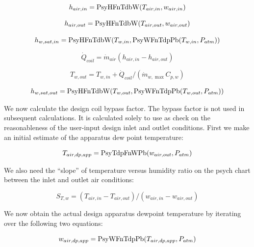 \begin{equation}
{h_{air,in}} = {\mathop{\rm PsyHFnTdbW}\nolimits} ({T_{air,in}},{w_{air,in}})
\end{equation}

\begin{equation}
{h_{air,out}} = {\mathop{\rm PsyHFnTdbW}\nolimits} ({T_{air,out}},{w_{air,out}})
\end{equation}

\begin{equation}
{h_{w,sat,in}} = {\rm{PsyHFnTdbW}}({T_{w,in}},{\rm{PsyWFnTdpPb}}({T_{w,in}},{P_{atm}}))
\end{equation}

\begin{equation}
{\dot Q_{coil}} = {\dot m_{air}}({h_{air,in}} - {h_{air,out}})
\end{equation}

\begin{equation}
{T_{w,out}} = {T_{w,in}} + {\dot Q_{coil}}/({\dot m_{w,\max }}{C_{p,w}})
\end{equation}

\begin{equation}
{h_{w,sat,out}} = {\rm{PsyHFnTdbW}}({T_{w,out}},{\rm{PsyWFnTdpPb}}({T_{w,out}},{P_{atm}}))
\end{equation}

We now calculate the design coil bypass factor. The bypass factor is not used in subsequent calculations. It is calculated solely to use as check on the reasonableness of the user-input design inlet and outlet conditions. First we make an initial estimate of the apparatus dew point temperature:

\begin{equation}
{T_{air,dp,app}} = {\rm{PsyTdpFnWPb}}({w_{air,out}},{P_{atm}})
\end{equation}

We also need the ``slope'' of temperature versus humidity ratio on the psych chart between the inlet and outlet air conditions:

\begin{equation}
{S_{T,w}} = ({T_{air,in}} - {T_{air,out}})/({w_{air,in}} - {w_{air,out}})
\end{equation}

We now obtain the actual design apparatus dewpoint temperature by iterating over the following two equations:

\begin{equation}
{w_{air,dp,app}} = {\rm{PsyWFnTdpPb}}({T_{air,dp,app}},{P_{atm}})
\end{equation}

